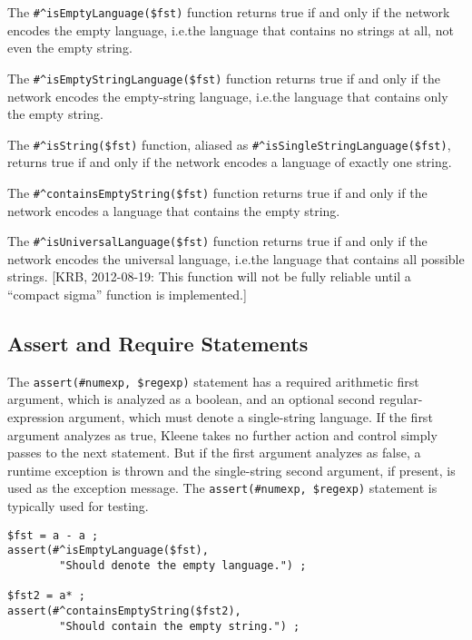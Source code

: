 The \verb!#^isEmptyLanguage($fst)! function returns true if and only if the network encodes the empty
language, i.e.\@ the language that contains no strings at all, not even the empty string.

The \verb!#^isEmptyStringLanguage($fst)! function returns true if and only if the network encodes the
empty-string language, i.e.\@ the language that contains only the empty string.

The \verb!#^isString($fst)! function, aliased as \verb!#^isSingleStringLanguage($fst)!, returns true if
and only if the network encodes a language of exactly one string.

The \verb!#^containsEmptyString($fst)! function returns true if and only if the network encodes a
language that contains the empty string.

The \verb!#^isUniversalLanguage($fst)! function returns true if and only if the network encodes the
universal language, i.e.\@ the language that contains all possible strings.  [KRB, 2012-08-19:  This
function will not be fully reliable until a ``compact sigma'' function is implemented.]

\subsection{Assert and Require Statements}

The \verb!assert(#numexp, $regexp)! statement has a required arithmetic first
argument, which is analyzed as a boolean, and an optional second
regular-expression argument, which must denote a single-string language.  If
the first argument analyzes as true, Kleene takes no further action and control simply passes to the next
statement.  But if the first argument analyzes as false, a runtime exception is thrown and
the single-string second argument, if present, is used as the exception
message.  The \verb!assert(#numexp, $regexp)! statement is typically used
for testing.

\begin{Verbatim}[fontsize=\small]
$fst = a - a ;
assert(#^isEmptyLanguage($fst), 
        "Should denote the empty language.") ;

$fst2 = a* ;
assert(#^containsEmptyString($fst2), 
        "Should contain the empty string.") ;
\end{Verbatim}

